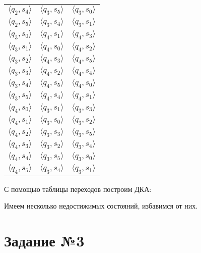 \documentclass[a4paper,12pt]{article}
\begin{document}
\begin{center}
\begin{tabular}{ |c|c|c| }
 $\langle q_2 , s_4 \rangle$ & $\langle q_3 , s_5 \rangle$ & $\langle q_3 , s_0 \rangle$ \\
 $\langle q_2 , s_5 \rangle$ & $\langle q_3 , s_4 \rangle$ & $\langle q_3 , s_1 \rangle$ \\ 
 $\langle q_3 , s_0 \rangle$ & $\langle q_4 , s_1 \rangle$ & $\langle q_4 , s_3 \rangle$ \\ 
 $\langle q_3 , s_1 \rangle$ & $\langle q_4 , s_0 \rangle$ & $\langle q_4 , s_2 \rangle$ \\
 $\langle q_3 , s_2 \rangle$ & $\langle q_4 , s_3 \rangle$ & $\langle q_4 , s_5 \rangle$ \\ 
 $\langle q_3 , s_3 \rangle$ & $\langle q_4 , s_2 \rangle$ & $\langle q_4 , s_4 \rangle$ \\
 $\langle q_3 , s_4 \rangle$ & $\langle q_4 , s_5 \rangle$ & $\langle q_4 , s_0 \rangle$ \\
 $\langle q_3 , s_5 \rangle$ & $\langle q_4 , s_4 \rangle$ & $\langle q_4 , s_1 \rangle$ \\ 
 $\langle q_4 , s_0 \rangle$ & $\langle q_3 , s_1 \rangle$ & $\langle q_3 , s_3 \rangle$ \\ 
 $\langle q_4 , s_1 \rangle$ & $\langle q_3 , s_0 \rangle$ & $\langle q_3 , s_2 \rangle$ \\
 $\langle q_4 , s_2 \rangle$ & $\langle q_3 , s_3 \rangle$ & $\langle q_3 , s_5 \rangle$ \\ 
 $\langle q_4 , s_3 \rangle$ & $\langle q_3 , s_2 \rangle$ & $\langle q_3 , s_4 \rangle$ \\
 $\langle q_4 , s_4 \rangle$ & $\langle q_3 , s_5 \rangle$ & $\langle q_3 , s_0 \rangle$ \\
 $\langle q_4 , s_5 \rangle$ & $\langle q_3 , s_4 \rangle$ & $\langle q_3 , s_1 \rangle$ \\ 
 \hline
\end{tabular}
\end{center}
С помощью таблицы переходов построим ДКА:
\begin{center}
\newline
\end{center}
Имеем несколько недостижимых состояний, избавимся от них.\newline
\begin{center}
\newline
\end{center}

\section*{\Huge Задание №3}
\end{document}
